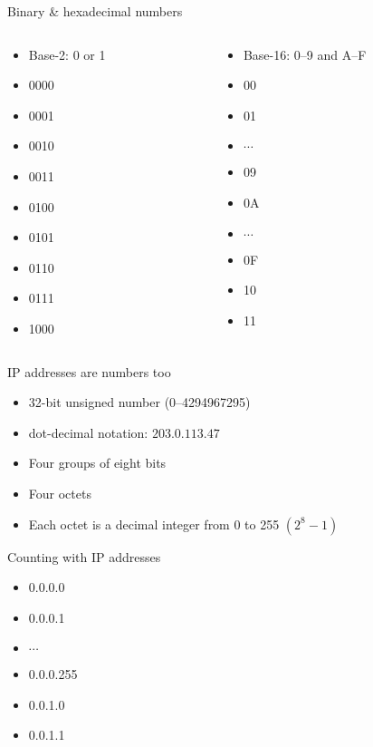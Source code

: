 \begin{frame}{Binary \& hexadecimal numbers}
   \begin{columns}[T]
      \begin{column}{.5\textwidth}
         \begin{itemize}[<+->]
            \item Base-2: 0 or 1
            \item 0000
            \item 0001
            \item 0010
            \item 0011
            \item 0100
            \item 0101
            \item 0110
            \item 0111
            \item 1000
         \end{itemize}
      \end{column}
      \begin{column}{.5\textwidth}
         \begin{itemize}[<+->]
            \item Base-16: 0--9 and A--F
            \item 00
            \item 01
            \item $\cdots$
            \item 09
            \item 0A
            \item $\cdots$
            \item 0F
            \item 10
            \item 11
         \end{itemize}
      \end{column}
   \end{columns}
\end{frame}



\begin{frame}{IP addresses are numbers too}
   \begin{itemize}[<+->]
      \item 32-bit unsigned number (0--\num{4294967295})
      \item dot-decimal notation: $203.0.113.47$
      \item Four groups of eight bits
      \item Four octets
      \item Each octet is a decimal integer from 0 to 255 $\left(2^8-1\right)$
   \end{itemize}
\end{frame}



\begin{frame}{Counting with IP addresses}
   \begin{itemize}[<+->]
      \item 0.0.0.0
      \item 0.0.0.1
      \item $\cdots$
      \item 0.0.0.255
      \item 0.0.1.0
      \item 0.0.1.1
   \end{itemize}
\end{frame}